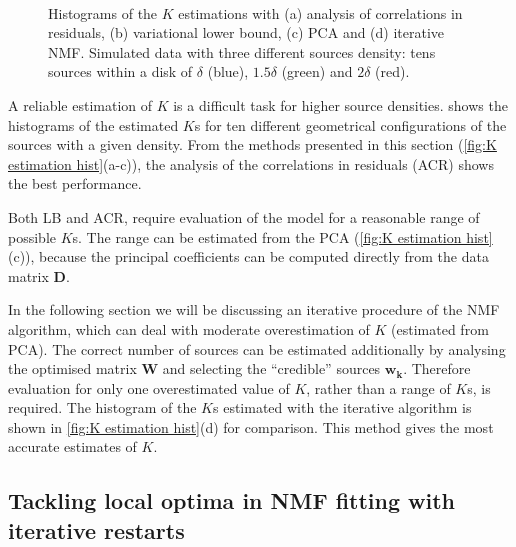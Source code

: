 \begin{figure}[!hbt]
	\newcommand{\sizef}{.4}		
	\centering
	\\
	\caption{Histograms of the $K$ estimations with (a) analysis of correlations in residuals, (b) variational lower bound, (c) PCA and (d) iterative NMF. Simulated data with three different sources density: tens sources within a disk of $\delta$ (blue), $1.5\delta$ (green) and $2\delta$ (red).}
	\label{fig:K estimation hist}
\end{figure}
%
A reliable estimation of $K$ is a difficult task for higher source densities.  shows the histograms of the estimated $K$s for ten different geometrical configurations of the sources with a given density. From the methods presented in this section  (\autoref{fig:K estimation hist}(a-c)), the analysis of the correlations in residuals (ACR) shows the best performance.

Both LB and ACR, require evaluation of the model for a reasonable range of possible $K$s. The range can be estimated from the PCA  (\autoref{fig:K estimation hist}(c)), because the principal coefficients can be computed directly from the data matrix $\bm{D}$.

In the following section we will be discussing an iterative procedure of the NMF algorithm, which can deal with moderate overestimation of $K$  (estimated from PCA). The correct number of sources can be estimated additionally by analysing the optimised matrix $\bm{W}$ and selecting the ``credible'' sources $\bm{w_{k}}$. Therefore evaluation for only one overestimated value of $K$, rather than a range of $K$s, is required. The histogram of the $K$s estimated with the iterative algorithm is shown in  \autoref{fig:K estimation hist}(d) for comparison. This method gives the most accurate estimates of $K$. 

\subsection{Tackling local optima in NMF fitting with iterative restarts \label{sub: Iterative restarts}}


